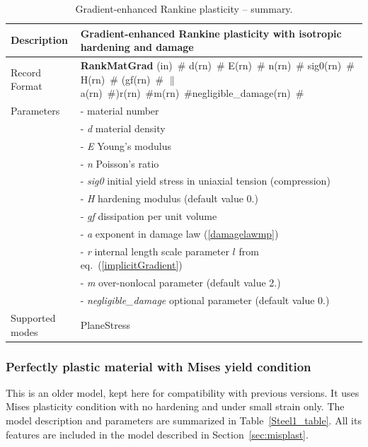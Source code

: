 \documentclass[a4paper]{article}
\newcommand{\descitem}[1]{{\noindent \bf #1}}
\newcommand{\elemparam}[2]{{{#1\tiny (#2)}~\#}}
\newcommand{\param}[1]{{\it #1}}
\begin{document}
\begin{table}[!htb]
\begin{tabular}{|l|p{9cm}|}
\hline
Description & Gradient-enhanced Rankine plasticity with isotropic hardening and damage\\
\hline
Record Format & \descitem{RankMatGrad}  \elemparam{}{in}
\elemparam{d}{rn} \elemparam{E}{rn} \elemparam{n}{rn} \elemparam{sig0}{rn} \elemparam{H}{rn} (\elemparam{gf}{rn} $\|$ \elemparam{a}{rn})\elemparam{r}{rn}\elemparam{m}{rn}\elemparam{negligible\_damage}{rn}\\
Parameters &- \param{} material number\\
&- \param{d} material density\\
&- \param{E} Young's modulus\\
&- \param{n} Poisson's ratio\\
&- \param{sig0} initial yield stress in uniaxial tension (compression)\\
&- \param{H} hardening modulus (default value 0.)\\
&- \param{gf} dissipation per unit volume\\
&- \param{a} exponent in damage law (\ref{damagelawmp})\\
&- \param{r} internal length scale parameter $l$ from eq.~(\ref{implicitGradient})\\
&- \param{m} over-nonlocal parameter (default value 2.)\\
&- \param{negligible\_damage} optional parameter (default value 0.)\\
Supported modes& PlaneStress\\
\hline
\end{tabular}
\caption{Gradient-enhanced Rankine plasticity -- summary.}
\label{rankineMatGrad_table}
\end{table}

\subsubsection{Perfectly plastic material with Mises yield condition}

This is an older model, kept here for compatibility with previous versions.
It uses Mises plasticity condition with no hardening and under small strain only.
The model description and parameters are summarized
in Table~\ref{Steel1_table}. All its features are included in the model
described in Section~\ref{sec:misplast}. 
\end{document}

